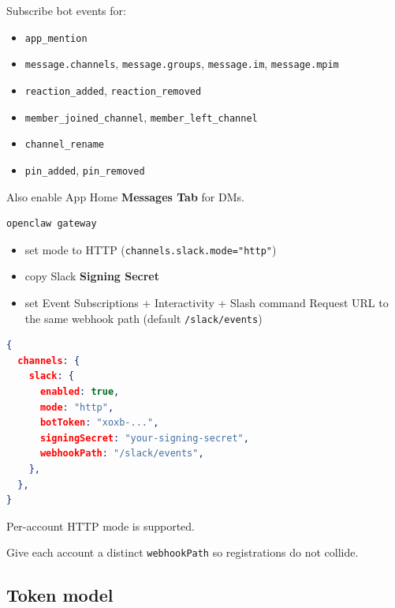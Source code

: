 Subscribe bot events for:

\begin{itemize}
  \item \texttt{app\_mention}
  \item \texttt{message.channels}, \texttt{message.groups}, \texttt{message.im}, \texttt{message.mpim}
  \item \texttt{reaction\_added}, \texttt{reaction\_removed}
  \item \texttt{member\_joined\_channel}, \texttt{member\_left\_channel}
  \item \texttt{channel\_rename}
  \item \texttt{pin\_added}, \texttt{pin\_removed}
\end{itemize}


Also enable App Home \textbf{Messages Tab} for DMs.


\begin{lstlisting}[language=bash]
openclaw gateway
\end{lstlisting}





\begin{itemize}
  \item set mode to HTTP (\texttt{channels.slack.mode="http"})
  \item copy Slack \textbf{Signing Secret}
  \item set Event Subscriptions + Interactivity + Slash command Request URL to the same webhook path (default \texttt{/slack/events})
\end{itemize}




\begin{lstlisting}[language=json]
{
  channels: {
    slack: {
      enabled: true,
      mode: "http",
      botToken: "xoxb-...",
      signingSecret: "your-signing-secret",
      webhookPath: "/slack/events",
    },
  },
}
\end{lstlisting}



Per-account HTTP mode is supported.

Give each account a distinct \texttt{webhookPath} so registrations do not collide.


\subsection{Token model}


